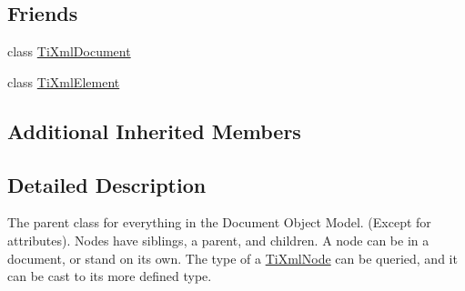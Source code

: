 \subsection*{Friends}
\begin{DoxyCompactItemize}
\item 
class \hyperlink{class_ti_xml_node_a173617f6dfe902cf484ce5552b950475}{Ti\+Xml\+Document}
\item 
class \hyperlink{class_ti_xml_node_ab6592e32cb9132be517cc12a70564c4b}{Ti\+Xml\+Element}
\end{DoxyCompactItemize}
\subsection*{Additional Inherited Members}


\subsection{Detailed Description}
The parent class for everything in the Document Object Model. (Except for attributes). Nodes have siblings, a parent, and children. A node can be in a document, or stand on its own. The type of a \hyperlink{class_ti_xml_node}{Ti\+Xml\+Node} can be queried, and it can be cast to its more defined type. 


